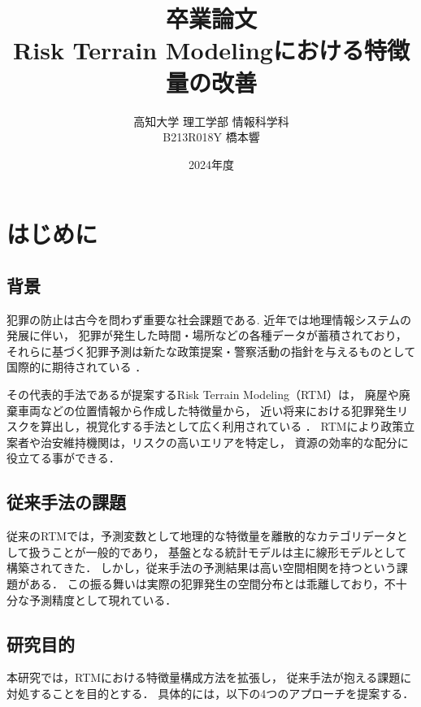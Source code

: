 \documentclass[12pt,a4paper,oneside]{jsbook}
\title{
卒業論文\\[1.5cm]
Risk Terrain Modelingにおける特徴量の改善\\[6cm]
}
\author{高知大学 理工学部 情報科学科\\[0.5cm]
B213R018Y 橋本響}
\date{2024年度}
\theoremstyle{plain}
\begin{document}
\maketitle
\tableofcontents

\chapter{はじめに}
\label{chapter_1}
\section{背景}
犯罪の防止は古今を問わず重要な社会課題である.
近年では地理情報システムの発展に伴い，
犯罪が発生した時間・場所などの各種データが蓄積されており\citep{ChicagoDataPortal}，
それらに基づく犯罪予測は新たな政策提案・警察活動の指針を与えるものとして国際的に期待されている
\citep{犯罪予測}．

その代表的手法である\citet{caplan2015risk}が提案するRisk Terrain Modeling（RTM）は，
廃屋や廃棄車両などの位置情報から作成した特徴量から，
近い将来における犯罪発生リスクを算出し，視覚化する手法として広く利用されている
\citep{地理的犯罪予測研究の潮流}．
RTMにより政策立案者や治安維持機関は，リスクの高いエリアを特定し，
資源の効率的な配分に役立てる事ができる\citep{犯罪予測}．

\section{従来手法の課題}
従来のRTMでは，予測変数として地理的な特徴量を離散的なカテゴリデータとして扱うことが一般的であり，
基盤となる統計モデルは主に線形モデルとして構築されてきた．
しかし，従来手法の予測結果は高い空間相関を持つという課題がある．
この振る舞いは実際の犯罪発生の空間分布とは乖離しており，不十分な予測精度として現れている．

\section{研究目的}
本研究では，RTMにおける特徴量構成方法を拡張し，
従来手法が抱える課題に対処することを目的とする．
具体的には，以下の4つのアプローチを提案する．
\end{document}
